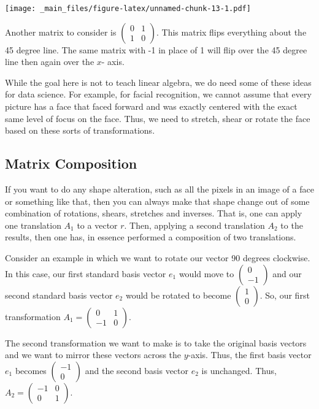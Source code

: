 \documentclass[
]{book}
\theoremstyle{definition}
\theoremstyle{definition}
\theoremstyle{definition}
\theoremstyle{definition}
\theoremstyle{remark}
\begin{document}
\texttt{[image: \_main\_files/figure-latex/unnamed-chunk-13-1.pdf]}

Another matrix to consider is \(\begin{pmatrix} 0 & 1 \\ 1 & 0 \end{pmatrix}\). This matrix flips everything about the 45 degree line. The same matrix with -1 in place of 1 will flip over the 45 degree line then again over the \(x\)- axis.

While the goal here is not to teach linear algebra, we do need some of these ideas for data science. For example, for facial recognition, we cannot assume that every picture has a face that faced forward and was exactly centered with the exact same level of focus on the face. Thus, we need to stretch, shear or rotate the face based on these sorts of transformations.

\hypertarget{matrix-composition}{%
\subsection{Matrix Composition}\label{matrix-composition}}

If you want to do any shape alteration, such as all the pixels in an image of a face or something like that, then you can always make that shape change out of some combination of rotations, shears, stretches and inverses. That is, one can apply one translation \(A_1\) to a vector \(r\). Then, applying a second translation \(A_2\) to the results, then one has, in essence performed a composition of two translations.

Consider an example in which we want to rotate our vector 90 degrees clockwise. In this case, our first standard basis vector \(e_1\) would move to \(\begin{pmatrix} 0 \\ -1 \end{pmatrix}\) and our second standard basis vector \(e_2\) would be rotated to become \(\begin{pmatrix} 1\\0 \end{pmatrix}\). So, our first transformation \(A_1 = \begin{pmatrix} 0 &1\\ -1 & 0 \end{pmatrix}\).

The second transformation we want to make is to take the original basis vectors and we want to mirror these vectors across the \(y\)-axis. Thus, the first basis vector \(e_1\) becomes \(\begin{pmatrix} -1\\0 \end{pmatrix}\) and the second basis vector \(e_2\) is unchanged. Thus, \(A_2 = \begin{pmatrix} -1 & 0\\0 & 1 \end{pmatrix}\).
\end{document}
